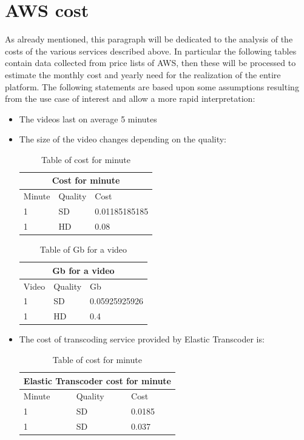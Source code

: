 \section{AWS cost}
\label{sec:AWS cost}
As already mentioned, this paragraph will be dedicated to the analysis of the costs of the various services described above.
In particular the following tables contain data collected from price lists of AWS, then these will be processed to estimate the monthly cost and yearly need for the realization of the entire platform.
The following statements are based upon some assumptions resulting from the use case of interest and allow a more rapid interpretation:

\begin{itemize}
\item The videos last on average 5 minutes
\item The size of the video changes depending on the quality:

\begin{table}[h!]
\centering
\begin{tabular}{ |p{3cm}|p{3cm}|p{3cm}|  }
  \hline
  \multicolumn{3}{|c|}{Cost for minute} \\
  \hline
  Minute & Quality & Cost \\
  \hline
  1 & SD & 0.01185185185 \\
  1 & HD & 0.08 \\
  \hline
\end{tabular}
\caption{Table of cost for minute}
\label{table:1}
\end{table}

\begin{table}[h!]
\centering
\begin{tabular}{ |p{3cm}|p{3cm}|p{3cm}|  }
  \hline
  \multicolumn{3}{|c|}{Gb for a video} \\
  \hline
  Video & Quality & Gb \\
  \hline
  1 & SD & 0.05925925926 \\
  1 & HD & 0.4 \\
  \hline
\end{tabular}
\caption{Table of Gb for a video}
\label{table:1}
\end{table}


\item The cost of transcoding service provided by Elastic Transcoder is:

\begin{table}[h!]
\centering
\begin{tabular}{ |p{3cm}|p{3cm}|p{3cm}|  }
  \hline
  \multicolumn{3}{|c|}{Elastic Transcoder cost for minute} \\
  \hline
  Minute & Quality & Cost \\
  \hline
  1 & SD & 0.0185 \\
  1 & SD & 0.037 \\
  \hline
\end{tabular}
\caption{Table of cost for minute}
\label{table:1}
\end{table}


\end{itemize}
